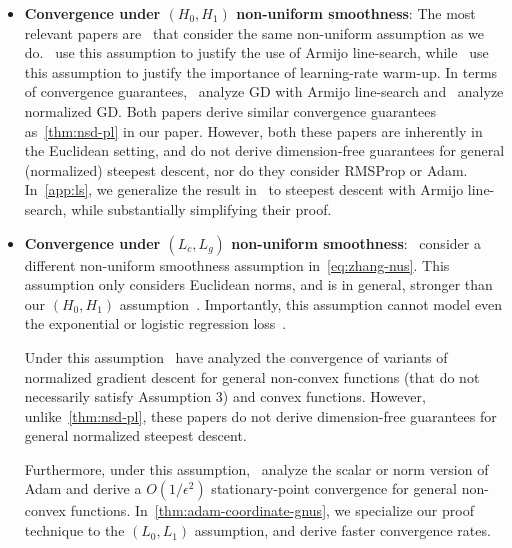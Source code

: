 \documentclass{article}
\begin{document}
    \begin{itemize}

        \item \textbf{Convergence under $(H_0, H_1)$ non-uniform smoothness}: The most relevant papers are~\citet{vaswani2025armijo,alimisis2025we} that consider the same non-uniform assumption as we do.~\citet{vaswani2025armijo} use this assumption to justify the use of Armijo line-search, while~\citet{alimisis2025we} use this assumption to justify the importance of learning-rate warm-up. In terms of convergence guarantees,~\citet{vaswani2025armijo} analyze GD with Armijo line-search and~\citet{alimisis2025we} analyze normalized GD. Both papers derive similar convergence guarantees as~\cref{thm:nsd-pl} in our paper. However, both these papers are inherently in the Euclidean setting, and do not derive dimension-free guarantees for general (normalized) steepest descent, nor do they consider RMSProp or Adam. In~\cref{app:ls}, we generalize the result in~\citet{vaswani2025armijo} to steepest descent with Armijo line-search, while substantially simplifying their proof.      
        
        \item \textbf{Convergence under $(L_c, L_g)$ non-uniform smoothness}:~\citep{zhang2019gradient,gorbunov2024methods,vankov2024optimizing,li2023convergence,wang2024convergence,wang2024provable} consider a different non-uniform smoothness assumption in~\cref{eq:zhang-nus}. This assumption only considers Euclidean norms, and is in general, stronger than our $(H_0, H_1)$ assumption~\citep{alimisis2025we}. Importantly, this assumption cannot model even the exponential or logistic regression loss~\citep{vaswani2025armijo}. 
        
        Under this assumption~\citep{zhang2019gradient,gorbunov2024methods,vankov2024optimizing} have analyzed the convergence of variants of normalized gradient descent for general non-convex functions (that do not necessarily satisfy Assumption 3) and convex functions. However, unlike~\cref{thm:nsd-pl}, these papers do not derive dimension-free guarantees for general normalized steepest descent. 
                
        Furthermore, under this assumption,~\citet{li2023convergence,wang2024convergence,wang2024provable} analyze the scalar or norm version of Adam and derive a $O(1/\epsilon^2)$ stationary-point convergence for general non-convex functions. In~\cref{thm:adam-coordinate-gnus}, we specialize our proof technique to the $(L_0, L_1)$ assumption, and derive faster convergence rates.

    \end{itemize}
\end{document}
